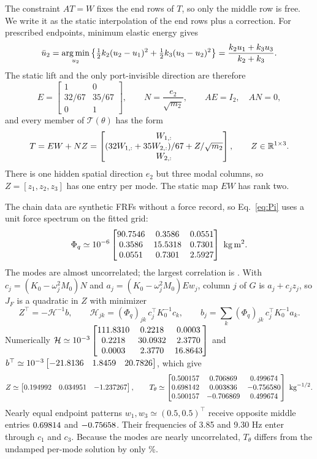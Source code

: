 The constraint $AT=W$ fixes the end rows of $T$, so only the middle row is
free. We write it as the static interpolation of the end rows plus a
correction. For prescribed endpoints, minimum elastic energy gives
\begin{equation}
 \bar u_2=\operatorname*{arg\,min}_{u_2}
 \left\{\tfrac12k_2(u_2-u_1)^2+\tfrac12k_3(u_3-u_2)^2\right\}
 =\frac{k_2u_1+k_3u_3}{k_2+k_3}.
 \label{eq:spring-elastic-square}
\end{equation}
The static lift and the only port-invisible direction are therefore
\begin{equation}
 E=\begin{bmatrix}1&0\\32/67&35/67\\0&1\end{bmatrix},\qquad
 N=\frac{e_2}{\sqrt{m_2}},\qquad AE=I_2,\quad AN=0,
 \label{eq:spring-lift}
\end{equation}
and every member of $\mathcal T(\theta)$ has the form
\begin{equation}
 T=EW+NZ=\begin{bmatrix}
 W_{1,:}\\ (32W_{1,:}+35W_{2,:})/67+Z/\sqrt{m_2}\\W_{2,:}
 \end{bmatrix},\qquad Z\in\mathbb R^{1\times3}.
 \label{eq:spring-T}
\end{equation}
There is one hidden spatial direction $e_2$ but three modal columns, so
$Z=[z_1,z_2,z_3]$ has one entry per mode. The static map $EW$ has rank two.

The chain data are synthetic FRFs without a force record, so
Eq.~\eqref{eq:Pi} uses a unit force spectrum on the fitted grid:
\[
 \Phi_q\simeq10^{-6}\SpringPi\ \mathrm{kg\,m^2}.
\]
The modes are almost uncorrelated; the largest correlation is
\SpringPiCorrelation. With $c_j=(K_0-\omega_j^2M_0)N$ and
$a_j=(K_0-\omega_j^2M_0)Ew_j$, column $j$ of $G$ is $a_j+c_jz_j$, so $J_F$
is a quadratic in $Z$ with minimizer
\begin{equation}
 Z^{\top}=-\mathcal H^{-1}b,\qquad
 \mathcal H_{jk}=(\Phi_q)_{jk}\,c_j^{\top}K_0^{-1}c_k,\qquad
 b_j=\sum_k(\Phi_q)_{jk}\,c_j^{\top}K_0^{-1}a_k.
 \label{eq:spring-scalar}
\end{equation}
Numerically $\mathcal H\simeq10^{-3}\begin{bmatrix}111.8310 & 0.2218 & 0.0003\\0.2218 & 30.0932 & 2.3770\\0.0003 & 2.3770 & 16.8643\end{bmatrix}$ and
$b^{\top}\simeq10^{-3}\begin{bmatrix}-21.8136 & 1.8459 & 20.7826\end{bmatrix}$, which give
\begin{equation}
 Z\simeq\begin{bmatrix}0.194992 & 0.034951 & -1.237267\end{bmatrix},\qquad
 T_\theta\simeq\begin{bmatrix}0.500157 & 0.706869 & 0.499674\\0.698142 & 0.003836 & -0.756580\\0.500157 & -0.706869 & 0.499674\end{bmatrix}\ \mathrm{kg}^{-1/2}.
 \label{eq:spring-completed}
\end{equation}
Nearly equal endpoint patterns $w_1,w_3\simeq(0.5,0.5)^{\top}$ receive
opposite middle entries $0.69814$ and $-0.75658$. Their
frequencies of 3.85 and 9.30 Hz enter through $c_1$ and $c_3$. Because the
modes are nearly uncorrelated, $T_\theta$ differs from the undamped
per-mode solution by only \SpringMapChange\%.

